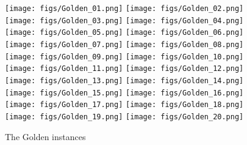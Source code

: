 \begin{figure}
  \centering
  \texttt{[image: figs/Golden\_01.png]}
  \texttt{[image: figs/Golden\_02.png]}
  \texttt{[image: figs/Golden\_03.png]}
  \texttt{[image: figs/Golden\_04.png]}
  \texttt{[image: figs/Golden\_05.png]}
  \texttt{[image: figs/Golden\_06.png]}
  \texttt{[image: figs/Golden\_07.png]}
  \texttt{[image: figs/Golden\_08.png]}
  \texttt{[image: figs/Golden\_09.png]}
  \texttt{[image: figs/Golden\_10.png]}
  \texttt{[image: figs/Golden\_11.png]}
  \texttt{[image: figs/Golden\_12.png]}
  \texttt{[image: figs/Golden\_13.png]}
  \texttt{[image: figs/Golden\_14.png]}
  \texttt{[image: figs/Golden\_15.png]}
  \texttt{[image: figs/Golden\_16.png]}
  \texttt{[image: figs/Golden\_17.png]}
  \texttt{[image: figs/Golden\_18.png]}
  \texttt{[image: figs/Golden\_19.png]}
  \texttt{[image: figs/Golden\_20.png]}
\caption{\label{Goldenplace} The Golden instances}
\end{figure}




